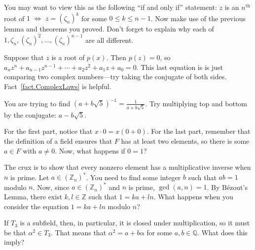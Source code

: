 \begin{hint*}
You may want to view this as the following ``if and only if'' statement: $z$ is an $n^\text{th}$ root of $1$ $\iff$ $z = (\zeta_n)^k$ for some $0\le k\le n-1$. Now make use of the previous lemma and theorems you proved. Don't forget to explain why each of $1, \zeta_n, (\zeta_n)^2, \ldots, (\zeta_n)^{n-1}$ are all different.
\end{hint*}

\begin{hint*}
Suppose that $z$ is a root of $p(x)$. Then $p(z) = 0$, so  $a_nz^n + a_{n-1}z^{n-1} +\cdots+a_2z^2+a_1z+a_0 = 0$. This last equation is is just comparing two complex numbers---try taking the conjugate of both sides. Fact~\ref{fact.ComplexLaws} is helpful.
\end{hint*}

\begin{hint*}
You are trying to find $(a+b\sqrt{5})^{-1} = \frac{1}{a+b\sqrt{5}}$. Try multiplying top and bottom by the conjugate: $a-b\sqrt{5}$.
\end{hint*}

\begin{hint*}
For the first part, notice that $x\cdot0 = x(0+0)$. For the last part, remember that the definition of a field ensures that $F$ has at least two elements, so there is some $a\in F$ with $a\neq 0$. Now, what happens if $0=1$?
\end{hint*}

\begin{hint*}
The crux is to show that every nonzero element has a multiplicative inverse when $n$ is prime. Let $a\in (\mathbb{Z}_n)^*$. You need to find some integer $b$ such that $ab=1$ modulo $n$. Now, since $a\in (\mathbb{Z}_n)^*$ and  $n$ is prime, $\gcd(a,n) = 1$. By B\'ezout's Lemma, there exist $k,l\in \mathbb{Z}$ such that $1 = ka+ln$. What happens when you consider the equation $1 = ka+ln$ modulo $n$?
\end{hint*}

\begin{hint*}
If $T_3$ is a subfield, then, in particular, it is closed under multiplication, so it must be that $\alpha^2\in T_3$. That means that $\alpha^2 = a+b\alpha$ for some $a,b\in \mathbb{Q}$. What does this imply?
\end{hint*}

